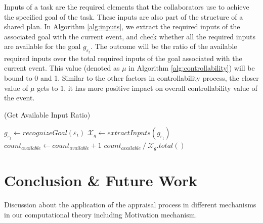 \documentclass[letterpaper]{article}
\begin{document}
Inputs of a task are the required elements that the collaborators use to
achieve the specified goal of the task. These inputs are also part of the
structure of a shared plan. In Algorithm \ref{alg:inputs}, we extract the
required inputs of the associated goal with the current event, and check whether
all the required inputs are available for the goal $\mathit{g}_{\varepsilon_t}$.
The outcome will be the ratio of the available required inputs over the total
required inputs of the goal associated with the current event. This value
(denoted as $\mu$ in Algorithm \ref{alg:controllability}) will be bound to 0 and
1. Similar to the other factors in controllability process, the closer value of
$\mu$ gets to 1, it has more positive impact on overall controllability value of
the event.

\begin{algorithm}
	\caption{(Get Available Input Ratio)}
	\label{alg:inputs}
	\begin{algorithmic}[1]
			\Statex
			\State $\mathit{g}_{\varepsilon_t} \gets
			\textit{recognizeGoal}{(\varepsilon_t)}$
			\Statex
				\State {}
			\EndIf
			\Statex
			\State $\mathcal{X}_{\mathit{g}} \gets
			\textit{extractInputs}{(\mathit{g}_{\varepsilon_t})}$
			\Statex
					\State $count_{available} \gets count_{available} + 1$
				\EndIf
			\EndFor
			\Statex
			\State \Return
			${count_{available} \mathbin{/} \mathcal{X}_{\mathit{g}}.total()}$
		\EndFunction 
	\end{algorithmic}
\end{algorithm}

\section{Conclusion \& Future Work}

Discussion about the application of the appraisal process in different
mechanisms in our computational theory including Motivation mechanism. 



\end{document}
